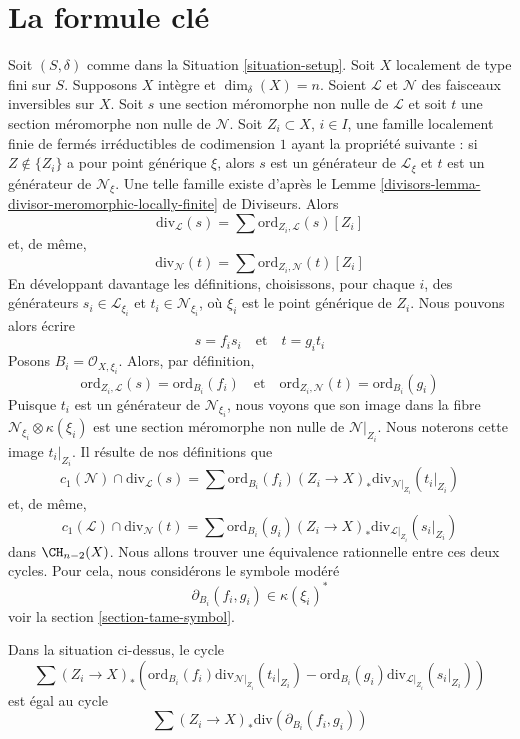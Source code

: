 \section{La formule clé}
\label{section-key}

\noindent
Soit $(S, \delta)$ comme dans la Situation \ref{situation-setup}.
Soit $X$ localement de type fini sur $S$. Supposons
$X$ intègre et $\dim_\delta(X) = n$.
Soient $\mathcal{L}$ et $\mathcal{N}$ des faisceaux inversibles sur $X$.
Soit $s$ une section méromorphe non nulle de $\mathcal{L}$ et
soit $t$ une section méromorphe non nulle de $\mathcal{N}$.
Soit $Z_i \subset X$, $i \in I$, une famille localement finie de fermés
irréductibles de codimension $1$ ayant la propriété suivante :
si $Z \not \in \{Z_i\}$ a pour point générique $\xi$, alors $s$ est un générateur
de $\mathcal{L}_\xi$ et $t$ est un générateur de $\mathcal{N}_\xi$.
Une telle famille existe d'après le
Lemme \ref{divisors-lemma-divisor-meromorphic-locally-finite} de Diviseurs.
Alors
$$
\text{div}_\mathcal{L}(s) = \sum \text{ord}_{Z_i, \mathcal{L}}(s) [Z_i]
$$
et, de même,
$$
\text{div}_\mathcal{N}(t) = \sum \text{ord}_{Z_i, \mathcal{N}}(t) [Z_i]
$$
En développant davantage les définitions, choisissons, pour chaque $i$, des générateurs
$s_i \in \mathcal{L}_{\xi_i}$ et $t_i \in \mathcal{N}_{\xi_i}$,
où $\xi_i$ est le point générique de $Z_i$. Nous pouvons alors écrire
$$
s = f_i s_i
\quad\text{et}\quad
t = g_i t_i
$$
Posons $B_i = \mathcal{O}_{X, \xi_i}$. Alors, par définition,
$$
\text{ord}_{Z_i, \mathcal{L}}(s) = \text{ord}_{B_i}(f_i)
\quad\text{et}\quad
\text{ord}_{Z_i, \mathcal{N}}(t) = \text{ord}_{B_i}(g_i)
$$
Puisque $t_i$ est un générateur de $\mathcal{N}_{\xi_i}$, nous voyons que
son image dans la fibre $\mathcal{N}_{\xi_i} \otimes \kappa(\xi_i)$
est une section méromorphe non nulle de $\mathcal{N}|_{Z_i}$. Nous noterons
cette image $t_i|_{Z_i}$. Il résulte de nos définitions que
$$
c_1(\mathcal{N}) \cap \text{div}_\mathcal{L}(s) =
\sum \text{ord}_{B_i}(f_i)
(Z_i \to X)_*\text{div}_{\mathcal{N}|_{Z_i}}(t_i|_{Z_i})
$$
et, de même,
$$
c_1(\mathcal{L}) \cap \text{div}_\mathcal{N}(t) =
\sum \text{ord}_{B_i}(g_i)
(Z_i \to X)_*\text{div}_{\mathcal{L}|_{Z_i}}(s_i|_{Z_i})
$$
dans $\CH_{n - 2}(X)$. Nous allons trouver une équivalence rationnelle entre
ces deux cycles. Pour cela, nous considérons le symbole modéré
$$
\partial_{B_i}(f_i, g_i) \in \kappa(\xi_i)^*
$$
voir la section \ref{section-tame-symbol}.

\begin{lemma}
\label{lemma-key-formula}
Dans la situation ci-dessus, le cycle
$$
\sum
(Z_i \to X)_*\left(
\text{ord}_{B_i}(f_i) \text{div}_{\mathcal{N}|_{Z_i}}(t_i|_{Z_i}) -
\text{ord}_{B_i}(g_i) \text{div}_{\mathcal{L}|_{Z_i}}(s_i|_{Z_i}) \right)
$$
est égal au cycle
$$
\sum (Z_i \to X)_*\text{div}(\partial_{B_i}(f_i, g_i))
$$
\end{lemma}

